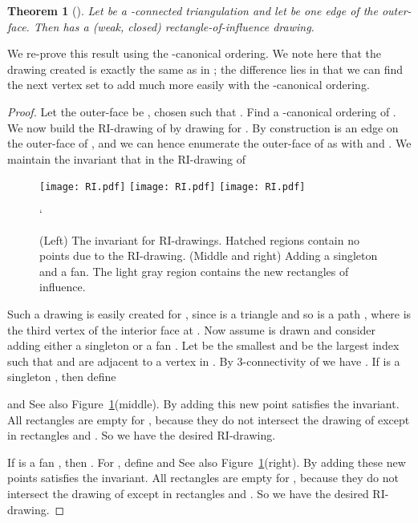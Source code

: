 \documentclass[12pt]{article}
\newtheorem{theorem}{Theorem}
\begin{document}
\begin{theorem}[\cite{BBM-GD99}]
\label{thm:ri}
Let  be a -connected triangulation and let  be one
edge of the outer-face.  Then  has a (weak, closed) 
rectangle-of-influence drawing.
\end{theorem}

We re-prove this result using the -canonical ordering.  We note
here that the drawing created is exactly the same as in \cite{BBM-GD99};
the difference lies in that we can find the next vertex set to add much
more easily with the -canonical ordering.

\begin{proof}
Let the outer-face be , chosen such that .
Find a -canonical ordering  of .  We
now build the RI-drawing of  by drawing  for .
By construction  is an edge on the outer-face of , and
we can hence enumerate the outer-face of  as 
with  and .  
We maintain the invariant
that in the RI-drawing of 

\begin{figure}[ht]
\hspace*{\fill}
\texttt{[image: RI.pdf]}
\hspace*{\fill}
\texttt{[image: RI.pdf]}
\hspace*{\fill}
\texttt{[image: RI.pdf]}
\hspace*{\fill}
\caption{(Left) The invariant for RI-drawings.  Hatched regions contain no points due to the RI-drawing.  (Middle and right) Adding a singleton
and a fan.  The light gray region contains the new rectangles of influence.}
\label{fig:RI}`
\end{figure}

Such a drawing is easily created for , since  is a triangle and
so  is a path , where  is the third vertex
of the interior face at .
Now assume  is drawn and consider adding either
a singleton or a fan .  Let  be the smallest and  be the
largest index such that  and  are adjacent to a vertex in .
By 3-connectivity of  we have .
If  is a singleton , then 
define 

and   See also
Figure~\ref{fig:RI}(middle).  By  adding this new point satisfies
the invariant.
All rectangles  are empty for , because they do not intersect
the drawing of  except in rectangles  and .
So we have the desired RI-drawing.

If  is a fan , then .
For , define 
and   See also
Figure~\ref{fig:RI}(right).  By  adding these new points satisfies the invariant.
All rectangles  are empty for , because they do not intersect
the drawing of  except in rectangles  and .
So we have the desired RI-drawing.
\end{proof}
\end{document}
